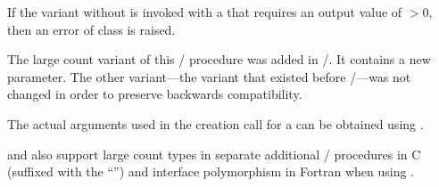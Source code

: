 If the  variant without
 is invoked with a  that
requires an output value of  $>0$,
then an error of class  is raised.

\begin{rationale}
  The large count variant of this \MPI/ procedure was added in \MPIIV/.
  It contains a new  parameter.  The
  other variant---the variant that existed before \MPIIV/---was
  not changed in order to preserve backwards compatibility.
\end{rationale}

The actual arguments used in the creation call for a 
can be obtained using .

 and  also support large \gb{}count types in
separate additional \MPI/ procedures in C (suffixed with the ``'') and interface
polymorphism  in Fortran when using .

